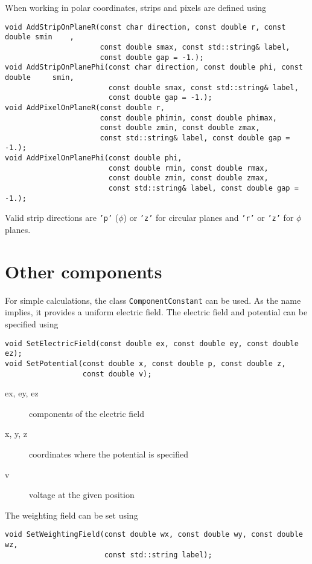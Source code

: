 When working in polar coordinates, strips and pixels are defined using
\begin{lstlisting}
void AddStripOnPlaneR(const char direction, const double r, const double smin    ,
                      const double smax, const std::string& label,
                      const double gap = -1.);
void AddStripOnPlanePhi(const char direction, const double phi, const double     smin,
                        const double smax, const std::string& label,
                        const double gap = -1.);
void AddPixelOnPlaneR(const double r,
                      const double phimin, const double phimax,
                      const double zmin, const double zmax,
                      const std::string& label, const double gap = -1.);
void AddPixelOnPlanePhi(const double phi,
                        const double rmin, const double rmax,
                        const double zmin, const double zmax,
                        const std::string& label, const double gap = -1.);
\end{lstlisting} 
Valid strip directions are \texttt{'p'} ($\phi$) or \texttt{'z'} for 
circular planes and \texttt{'r'} or \texttt{'z'} for $\phi$ planes.

\section{Other components}

For simple calculations, the class \texttt{ComponentConstant} can be used. 
As the name implies, it provides a uniform electric field. 
The electric field and potential can be specified using
\begin{lstlisting}
void SetElectricField(const double ex, const double ey, const double ez);
void SetPotential(const double x, const double p, const double z,
                  const double v);
\end{lstlisting}
\begin{description}
  \item[ex, ey, ez]
  components of the electric field
  \item[x, y, z]
  coordinates where the potential is specified
  \item[v]
  voltage at the given position
\end{description}
The weighting field can be set using
\begin{lstlisting}
void SetWeightingField(const double wx, const double wy, const double wz,
                       const std::string label);
\end{lstlisting}

